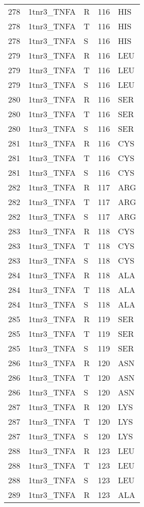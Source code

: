 \begin{longtable}[l]{l|l|l|l|l}
	278 & 1tnr3_TNFA & R & 116 & HIS \\
	278 & 1tnr3_TNFA & T & 116 & HIS \\
	278 & 1tnr3_TNFA & S & 116 & HIS \\
	279 & 1tnr3_TNFA & R & 116 & LEU \\
	279 & 1tnr3_TNFA & T & 116 & LEU \\
	279 & 1tnr3_TNFA & S & 116 & LEU \\
	280 & 1tnr3_TNFA & R & 116 & SER \\
	280 & 1tnr3_TNFA & T & 116 & SER \\
	280 & 1tnr3_TNFA & S & 116 & SER \\
	281 & 1tnr3_TNFA & R & 116 & CYS \\
	281 & 1tnr3_TNFA & T & 116 & CYS \\
	281 & 1tnr3_TNFA & S & 116 & CYS \\
	282 & 1tnr3_TNFA & R & 117 & ARG \\
	282 & 1tnr3_TNFA & T & 117 & ARG \\
	282 & 1tnr3_TNFA & S & 117 & ARG \\
	283 & 1tnr3_TNFA & R & 118 & CYS \\
	283 & 1tnr3_TNFA & T & 118 & CYS \\
	283 & 1tnr3_TNFA & S & 118 & CYS \\
	284 & 1tnr3_TNFA & R & 118 & ALA \\
	284 & 1tnr3_TNFA & T & 118 & ALA \\
	284 & 1tnr3_TNFA & S & 118 & ALA \\
	285 & 1tnr3_TNFA & R & 119 & SER \\
	285 & 1tnr3_TNFA & T & 119 & SER \\
	285 & 1tnr3_TNFA & S & 119 & SER \\
	286 & 1tnr3_TNFA & R & 120 & ASN \\
	286 & 1tnr3_TNFA & T & 120 & ASN \\
	286 & 1tnr3_TNFA & S & 120 & ASN \\
	287 & 1tnr3_TNFA & R & 120 & LYS \\
	287 & 1tnr3_TNFA & T & 120 & LYS \\
	287 & 1tnr3_TNFA & S & 120 & LYS \\
	288 & 1tnr3_TNFA & R & 123 & LEU \\
	288 & 1tnr3_TNFA & T & 123 & LEU \\
	288 & 1tnr3_TNFA & S & 123 & LEU \\
	289 & 1tnr3_TNFA & R & 123 & ALA \\

\end{longtable}
